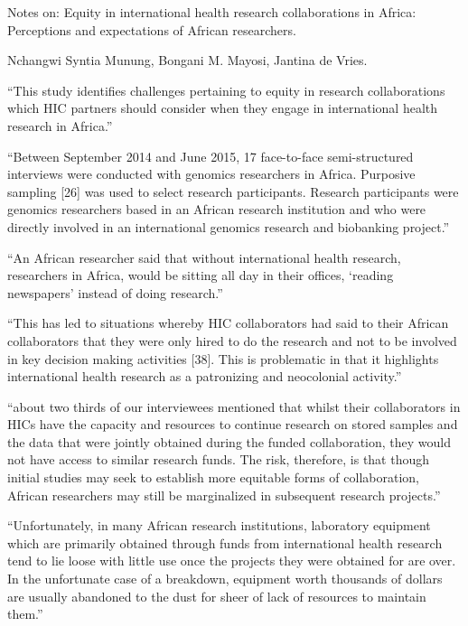 \documentclass{article}
\begin{document}
\begin{center}
Notes on: Equity in international health research collaborations in
Africa: Perceptions and expectations of African researchers.

Nchangwi Syntia Munung, Bongani M. Mayosi, Jantina de Vries.
\end{center}

``This study identifies challenges pertaining to equity in research
collaborations which HIC partners should consider when they engage in
international health research in Africa.''

``Between September 2014 and June 2015, 17 face-to-face
semi-structured interviews were conducted with genomics researchers in
Africa. Purposive sampling [26] was used to select research
participants. Research participants were genomics researchers based in
an African research institution and who were directly involved in an
international genomics research and biobanking project.''

``An African researcher said that without international health
research, researchers in Africa, would be sitting all day in their
offices, `reading newspapers' instead of doing research.''

``This has led to situations whereby HIC collaborators had said to
their African collaborators that they were only hired to do the
research and not to be involved in key decision making activities
[38]. This is problematic in that it highlights international health
research as a patronizing and neocolonial activity.''

``about two thirds of our interviewees mentioned that whilst their
collaborators in HICs have the capacity and resources to continue
research on stored samples and the data that were jointly obtained
during the funded collaboration, they would not have access to similar
research funds. The risk, therefore, is that though initial studies
may seek to establish more equitable forms of collaboration, African
researchers may still be marginalized in subsequent research
projects.''

``Unfortunately, in many African research institutions, laboratory
equipment which are primarily obtained through funds from
international health research tend to lie loose with little use once
the projects they were obtained for are over. In the unfortunate case
of a breakdown, equipment worth thousands of dollars are usually
abandoned to the dust for sheer of lack of resources to maintain
them.''
\end{document}
